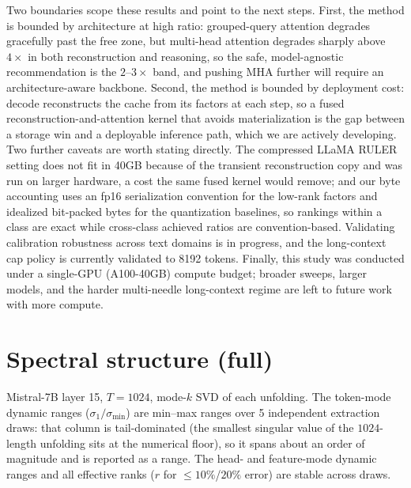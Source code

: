 \documentclass{article}
\begin{document}
Two boundaries scope these results and point to the next steps. First, the method is bounded by architecture at high ratio: grouped-query attention degrades gracefully past the free zone, but multi-head attention degrades sharply above $4\times$ in both reconstruction and reasoning, so the safe, model-agnostic recommendation is the $2$--$3\times$ band, and pushing MHA further will require an architecture-aware backbone. Second, the method is bounded by deployment cost: decode reconstructs the cache from its factors at each step, so a fused reconstruction-and-attention kernel that avoids materialization is the gap between a storage win and a deployable inference path, which we are actively developing. Two further caveats are worth stating directly. The compressed LLaMA RULER setting does not fit in 40GB because of the transient reconstruction copy and was run on larger hardware, a cost the same fused kernel would remove; and our byte accounting uses an fp16 serialization convention for the low-rank factors and idealized bit-packed bytes for the quantization baselines, so rankings within a class are exact while cross-class achieved ratios are convention-based. Validating calibration robustness across text domains is in progress, and the long-context cap policy is currently validated to 8192 tokens. Finally, this study was conducted under a single-GPU (A100-40GB) compute budget; broader sweeps, larger models, and the harder multi-needle long-context regime are left to future work with more compute.

\clearpage



\clearpage
\appendix
\section{Spectral structure (full)}
\label{app:spectral}
Mistral-7B layer 15, $T{=}1024$, mode-$k$ SVD of each unfolding. The token-mode dynamic ranges ($\sigma_1/\sigma_{\min}$) are min--max ranges over 5 independent extraction draws: that column is tail-dominated (the smallest singular value of the $1024$-length unfolding sits at the numerical floor), so it spans about an order of magnitude and is reported as a range. The head- and feature-mode dynamic ranges and all effective ranks ($r$ for $\le 10\%$/$20\%$ error) are stable across draws.
\end{document}
